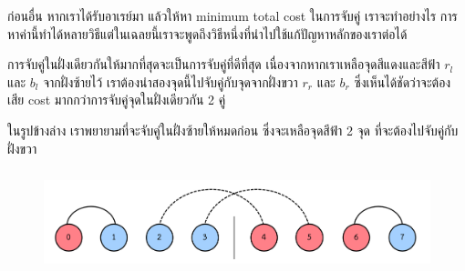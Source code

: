 \documentclass[12pt]{article}
\begin{document}
ก่อนอื่น หากเราได้รับอาเรย์มา แล้วให้หา minimum total cost ในการจับคู่ เราจะทำอย่างไร การหาค่านี้ทำได้หลายวิธีแต่ในเฉลยนี้เราจะพูดถึงวิธีหนึ่งที่นำไปใช้แก้ปัญหาหลักของเราต่อได้


การจับคู่ในฝั่งเดียวกันให้มากที่สุดจะเป็นการจับคู่ที่ดีที่สุด เนื่องจากหากเราเหลือจุดสีแดงและสีฟ้า $r_l$ และ $b_l$ จากฝั่งซ้ายไว้ เราต้องนำสองจุดนี้ไปจับคู่กับจุดจากฝั่งขวา $r_r$ และ $b_r$ ซึ่งเห็นได้ชัดว่าจะต้องเสีย cost มากกว่าการจับคู่จุดในฝั่งเดียวกัน 2 คู่

\begin{figure}[h]
  \centering
  \hfill
  \hfill
  \hfill
\end{figure}

ในรูปข้างล่าง เราพยายามที่จะจับคู่ในฝั่งซ้ายให้หมดก่อน ซึ่งจะเหลือจุดสีฟ้า 2 จุด ที่จะต้องไปจับคู่กับฝั่งขวา

\begin{figure}[h]
  \centering
  \includegraphics[height=3cm]{./images/colorblind1.png}
\end{figure}
\end{document}
